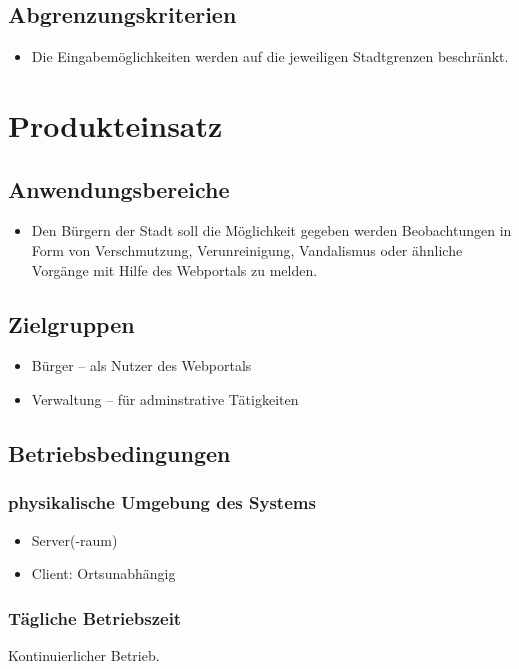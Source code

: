 \documentclass[a4paper,11pt]{scrartcl}
\begin{document}
	\subsection{Abgrenzungskriterien}
		\begin{itemize}
			\item Die Eingabemöglichkeiten werden auf die jeweiligen Stadtgrenzen beschränkt.
		\end{itemize}
\section{Produkteinsatz}
	\subsection{Anwendungsbereiche}
		\begin{itemize}
			\item Den Bürgern der Stadt soll die Möglichkeit gegeben werden Beobachtungen in Form von Verschmutzung, Verunreinigung, Vandalismus oder ähnliche Vorgänge mit Hilfe des Webportals zu melden.
		\end{itemize}
	\subsection{Zielgruppen}
		\begin{itemize}
			\item Bürger -- als Nutzer des Webportals
			\item Verwaltung -- für adminstrative Tätigkeiten
		\end{itemize}
	\subsection{Betriebsbedingungen}
		\subsubsection{physikalische Umgebung des Systems}
			\begin{itemize}
				\item Server(-raum)
				\item Client: Ortsunabhängig
			\end{itemize}
		\subsubsection{Tägliche Betriebszeit}
			Kontinuierlicher Betrieb.
\end{document}
